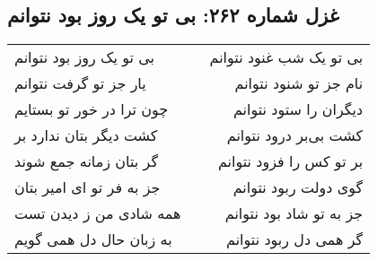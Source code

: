 \begin{center}
\section*{غزل شماره ۲۶۲: بی تو یک روز بود نتوانم}
\label{sec:262}
\begin{longtable}{l p{0.5cm} r}
بی تو یک روز بود نتوانم
&&
بی تو یک شب غنود نتوانم
\\
یار جز تو گرفت نتوانم
&&
نام جز تو شنود نتوانم
\\
چون ترا در خور تو بستایم
&&
دیگران را ستود نتوانم
\\
کشت دیگر بتان ندارد بر
&&
کشت بی‌بر درود نتوانم
\\
گر بتان زمانه جمع شوند
&&
بر تو کس را فزود نتوانم
\\
جز به فر تو ای امیر بتان
&&
گوی دولت ربود نتوانم
\\
همه شادی من ز دیدن تست
&&
جز به تو شاد بود نتوانم
\\
به زبان حال دل همی گویم
&&
گر همی دل ربود نتوانم
\\
\end{longtable}
\end{center}
